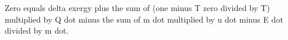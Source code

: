 Zero equals delta exergy plus the sum of (one minus T zero divided by T) multiplied by Q dot minus the sum of m dot multiplied by u dot minus E dot divided by m dot.